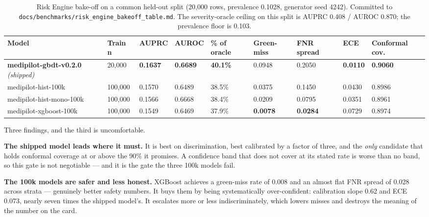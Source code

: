\documentclass[10pt,a4paper,twocolumn]{article}
\newcommand{\pth}[1]{\textcolor{SecPurple}{\texttt{#1}}}
\begin{document}
\begin{table}[t]
\centering\footnotesize\sffamily
\caption{Risk Engine bake-off on a common held-out split (20{,}000 rows, prevalence 0.1028,
generator seed 4242). Committed to \pth{docs/benchmarks/risk\_engine\_bakeoff\_table.md}. The
severity-oracle ceiling on this split is AUPRC 0.408 / AUROC 0.870; the prevalence floor is 0.103.}
\label{tab:bakeoff}
\begin{tabular}{@{}p{3.95cm}p{1.15cm}p{1.05cm}p{1.05cm}p{1.25cm}p{1.35cm}p{1.35cm}p{1.05cm}p{1.75cm}@{}}
\toprule
\rowcolor{AccPurple!10}
\textbf{Model} & \textbf{Train n} & \textbf{AUPRC} & \textbf{AUROC} & \textbf{\% of oracle} & \textbf{Green-miss} & \textbf{FNR spread} & \textbf{ECE} & \textbf{Conformal cov.}\\
\midrule
\rowcolor{AccPurple!7}
\textbf{medipilot-gbdt-v0.2.0} \emph{(shipped)} & 20{,}000 & \textbf{0.1637} & \textbf{0.6689} & \textbf{40.1\%} & 0.0948 & 0.2050 & \textbf{0.0110} & \textbf{0.9060}\\
medipilot-hist-100k & 100{,}000 & 0.1570 & 0.6489 & 38.5\% & 0.0375 & 0.1450 & 0.0430 & 0.8986\\
medipilot-hist-mono-100k & 100{,}000 & 0.1566 & 0.6668 & 38.4\% & 0.0209 & 0.0795 & 0.0351 & 0.8961\\
medipilot-xgboost-100k & 100{,}000 & 0.1549 & 0.6469 & 37.9\% & \textbf{0.0078} & \textbf{0.0284} & 0.0729 & 0.8974\\
\bottomrule
\end{tabular}
\end{table}

Three findings, and the third is uncomfortable.

\textbf{The shipped model leads where it must.} It is best on discrimination, best calibrated by a
factor of three, and the \emph{only} candidate that holds conformal coverage at or above the 90\%
it promises. A confidence band that does not cover at its stated rate is worse than no band, so
this gate is not negotiable --- and it is the gate the three 100k models fail.

\textbf{The 100k models are safer and less honest.} XGBoost achieves a green-miss rate of 0.008 and
an almost flat FNR spread of 0.028 across strata --- genuinely better safety numbers. It buys them
by being systematically over-confident: calibration slope 0.62 and ECE 0.073, nearly seven times
the shipped model's. It escalates more or less indiscriminately, which lowers misses and destroys
the meaning of the number on the card.
\end{document}
